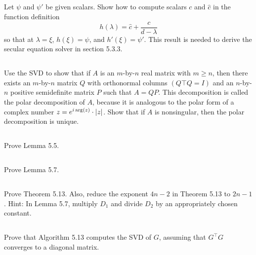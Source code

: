 \documentclass[a4paper]{ctexart}
\newcommand{\pf}{\textbf{\color{pink}{proof:}}}
\newcommand{\bymn}[2]{$#1$-by-$#2$}
\begin{document}
\pf

\subsection{}
Let $\psi$ and $\psi'$ be given scalars. Show how to compute
scalars $c$ and $\hat{c}$ in the function deﬁnition
\begin{equation*}
    h(\lambda) = \hat{c} + \frac{c}{d-\lambda}
\end{equation*} so that at $\lambda = \xi$,
$h(\xi) = \psi$, and $h'(\xi) = \psi'$. This result is needed to derive the secular equation
solver in section 5.3.3.

\pf

\subsection{}
Use the SVD to show that if $A$ is an \bymn{m}{n} real matrix with $m \ge n$, then there exists an \bymn{m}{n} matrix $Q$ with
orthonormal columns $(Q\top Q = I)$ and an \bymn{n}{n} positive semidefinite matrix $P$
such that $A = QP$. This decomposition is called the polar decomposition of $A$,
because it is analogous to the polar form of a complex number $z = e^{i\arg(z)} \cdot\abs{z}$.
Show that if $A$ is nonsingular, then the polar decomposition is unique.

\pf

\subsection{}
Prove Lemma 5.5.

\pf

\subsection{}
Prove Lemma 5.7.

\pf

\subsection{}

Prove Theorem 5.13. Also, reduce the exponent $4n -2$ in Theorem 5.13 to $2n - 1$. Hint: In Lemma 5.7, multiply $D_1$ and divide $D_2$
by an appropriately chosen constant.

\pf

\subsection{}
Prove that Algorithm 5.13 computes the SVD of
$G$, assuming that $G^\top G$ converges to a diagonal matrix.
\end{document}
